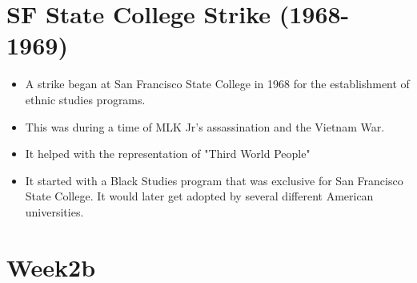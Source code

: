 \documentclass{article}
\begin{document}
\section{SF State College Strike (1968-1969)}
\begin{itemize}
  \item A strike began at San Francisco State College in 1968
    for the establishment of ethnic studies programs.
  \item This was during a time of MLK Jr's assassination and the Vietnam War.
  \item It helped with the representation of "Third World People"
  \item It started with a Black Studies program that
    was exclusive for San Francisco State College.
    It would later get adopted by several different American universities.
\end{itemize}

\pagebreak

\section*{Week2b}
\end{document}
